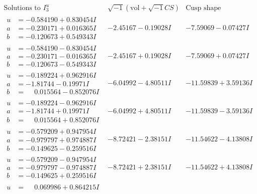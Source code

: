 \documentclass[1p]{elsarticle_modified}
\theoremstyle{definition}
\newcommand{\I}{\sqrt{-1}}
\begin{document}
$$\begin{array}{c|c|c}  
\text{Solutions to }I^u_{3}& \I (\text{vol} + \sqrt{-1}CS) & \text{Cusp shape}\\
 \hline 
\begin{aligned}
u &= -0.584190 + 0.830454 I \\
a &= -0.230171 + 0.016365 I \\
b &= -0.120673 + 0.549343 I\end{aligned}
 & -2.45167 - 0.19028 I & -7.59069 - 0.07427 I \\ \hline\begin{aligned}
u &= -0.584190 - 0.830454 I \\
a &= -0.230171 - 0.016365 I \\
b &= -0.120673 - 0.549343 I\end{aligned}
 & -2.45167 + 0.19028 I & -7.59069 + 0.07427 I \\ \hline\begin{aligned}
u &= -0.189224 + 0.962916 I \\
a &= -1.81744 - 0.19971 I \\
b &= \phantom{-}0.015564 - 0.852076 I\end{aligned}
 & -6.04992 - 4.80511 I & -11.59839 + 3.59136 I \\ \hline\begin{aligned}
u &= -0.189224 - 0.962916 I \\
a &= -1.81744 + 0.19971 I \\
b &= \phantom{-}0.015564 + 0.852076 I\end{aligned}
 & -6.04992 + 4.80511 I & -11.59839 - 3.59136 I \\ \hline\begin{aligned}
u &= -0.579209 + 0.947954 I \\
a &= -0.979797 + 0.974887 I \\
b &= -0.149625 - 0.259516 I\end{aligned}
 & -8.72421 - 2.38151 I & -11.54622 - 4.13808 I \\ \hline\begin{aligned}
u &= -0.579209 - 0.947954 I \\
a &= -0.979797 - 0.974887 I \\
b &= -0.149625 + 0.259516 I\end{aligned}
 & -8.72421 + 2.38151 I & -11.54622 + 4.13808 I \\ \hline\begin{aligned}
u &= \phantom{-}0.069986 + 0.864215 I \\

\end{aligned}
\end{array}$$
\end{document}
